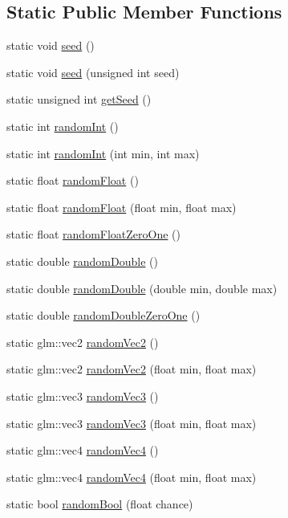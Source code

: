 \subsection*{Static Public Member Functions}
\begin{DoxyCompactItemize}
\item 
static void \mbox{\hyperlink{classec_1_1_random_a3e4ad02afb2979b3549fbd70e6f71412}{seed}} ()
\item 
static void \mbox{\hyperlink{classec_1_1_random_aa2b21cb97b3a7c36e89b8afda6ca500d}{seed}} (unsigned int seed)
\item 
static unsigned int \mbox{\hyperlink{classec_1_1_random_a59c8074b3adbaa81ad9e82d3f398b441}{get\+Seed}} ()
\item 
static int \mbox{\hyperlink{classec_1_1_random_a65aa91d5a51008a4c8b1ef03f42ede7a}{random\+Int}} ()
\item 
static int \mbox{\hyperlink{classec_1_1_random_a0519c84300b7bfaaf8854f013e949adf}{random\+Int}} (int min, int max)
\item 
static float \mbox{\hyperlink{classec_1_1_random_aac4221fbbea9b7deb106c9a9c7b870d3}{random\+Float}} ()
\item 
static float \mbox{\hyperlink{classec_1_1_random_ae00f0b2aff06c493c2d8e47b5c9c3de0}{random\+Float}} (float min, float max)
\item 
static float \mbox{\hyperlink{classec_1_1_random_a4b2cd2191091e926caf1a5e7ce455a04}{random\+Float\+Zero\+One}} ()
\item 
static double \mbox{\hyperlink{classec_1_1_random_a121adac4b6557b213e059b1e15bad496}{random\+Double}} ()
\item 
static double \mbox{\hyperlink{classec_1_1_random_a5b7ce52c95262159a19684eed32d2648}{random\+Double}} (double min, double max)
\item 
static double \mbox{\hyperlink{classec_1_1_random_a11f29fbbc13a8e5a5671a33945a858a1}{random\+Double\+Zero\+One}} ()
\item 
static glm\+::vec2 \mbox{\hyperlink{classec_1_1_random_a6da9a117b49917951c77e09f25f20b4a}{random\+Vec2}} ()
\item 
static glm\+::vec2 \mbox{\hyperlink{classec_1_1_random_a0a8e82e0563c6358ad18dae596451a87}{random\+Vec2}} (float min, float max)
\item 
static glm\+::vec3 \mbox{\hyperlink{classec_1_1_random_a4242b9cac76d3e88bde39826ddbd6e3c}{random\+Vec3}} ()
\item 
static glm\+::vec3 \mbox{\hyperlink{classec_1_1_random_a84ec2078788971de906b5f2f17a61d55}{random\+Vec3}} (float min, float max)
\item 
static glm\+::vec4 \mbox{\hyperlink{classec_1_1_random_a14fae11ffad84de3a030d5f218192bcf}{random\+Vec4}} ()
\item 
static glm\+::vec4 \mbox{\hyperlink{classec_1_1_random_aaa2a5ec20d1e3c2b44e75ada89519982}{random\+Vec4}} (float min, float max)
\item 
static bool \mbox{\hyperlink{classec_1_1_random_ae8d7f55e5847d7c83e72539b5517dc8d}{random\+Bool}} (float chance)
\end{DoxyCompactItemize}


